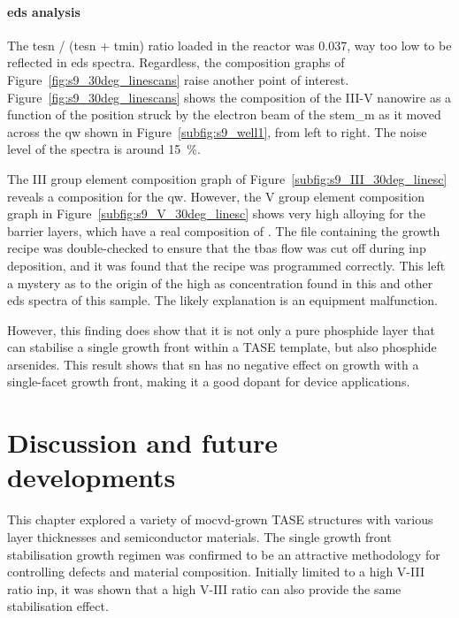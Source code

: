 \paragraph{\acs{eds} analysis} The \acs{tesn} / (\acs{tesn} + \acs{tmin}) ratio loaded in the reactor was \num{0.037}, way too low to be reflected in \acs{eds} spectra. Regardless, the composition graphs of Figure~\ref{fig:s9_30deg_linescans} raise another point of interest. Figure~\ref{fig:s9_30deg_linescans} shows the composition of the III-V nanowire as a function of the position struck by the electron beam of the \acs{stem_m} as it moved across the \acl{qw} shown in Figure~\ref{subfig:s9_well1}, from left to right. The noise level of the spectra is around \qty{15}{\%}.

The III group element composition graph of Figure~\ref{subfig:s9_III_30deg_linesc} reveals a  composition for the \acl{qw}. However, the V group element composition graph in Figure~\ref{subfig:s9_V_30deg_linesc} shows very high alloying for the barrier layers, which have a real composition of . The file containing the growth recipe was double-checked to ensure that the \acs{tbas} flow was cut off during \acs{inp} deposition, and it was found that the recipe was programmed correctly. This left a mystery as to the origin of the high \acl{as} concentration found in this and other \acs{eds} spectra of this sample. The likely explanation is an equipment malfunction.

However, this finding does show that it is not only a pure phosphide layer that can stabilise a single  growth front within a \acs{TASE} template, but also phosphide arsenides. This result shows that \acl{sn} has no negative effect on growth with a single-facet growth front, making it a good dopant for device applications.

\section{Discussion and future developments}

This chapter explored a variety of \acs{mocvd}-grown \acs{TASE} structures with various layer thicknesses and semiconductor materials. The  single growth front stabilisation growth regimen was confirmed to be an attractive methodology for controlling defects and material composition. Initially limited to a high V-III ratio \acs{inp}, it was shown that a high V-III ratio  can also provide the same  stabilisation effect. 


